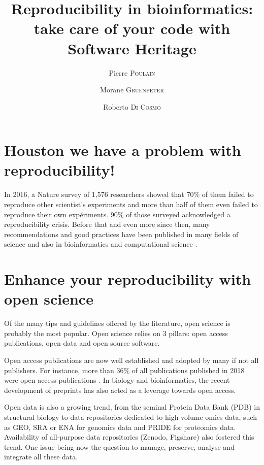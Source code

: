 \documentclass[long, final]{jobim}
\title{Reproducibility in bioinformatics: take care of your code with Software Heritage}
\author{Pierre \textsc{Poulain}\inst{1} \and Morane \textsc{Gruenpeter}\inst{2} \and Roberto \textsc{Di Cosmo}\inst{3}}
\institute{
 Université de Paris, CNRS, Institut Jacques Monod, F-75006, Paris, France
 \and
 Software Heritage, Inria, France
 \and
 Software Heritage, Inria and University of Paris, France
}
\begin{document}

   \maketitle

 \section{Houston we have a problem with reproducibility!}
 \label{sec:introduction}

In 2016, a Nature survey of 1,576 researchers \cite{baker2016b} showed that 70\% of them failed to reproduce other scientist’s experiments and more than half of them even failed to reproduce their own expériments. 90\% of those surveyed acknowledged a reproducibility crisis. Before that \cite{donoho2010,peng2011,markowetz2015} and even more since then, many recommendations and good practices have been published in many fields of science and also in bioinformatics and computational science \cite{barba2016,gruning2018,kim2018,barba2019}. 

\section{Enhance your reproducibility with open science}
\label{sec:enhance}

Of the many tips and guidelines offered by the literature, open science is probably the most popular. Open science relies on 3 pillars: open access publications, open data and open source software.

Open access publications are now well established and adopted by many if not all publishers. For instance, more than 36\% of all publications published in 2018 were open access publications \cite{trendsopenaccesspublications}. In biology and bioinformatics, the recent development of preprints has also acted as a leverage towards open access.

Open data is also a growing trend, from the seminal Protein Data Bank (PDB) in structural biology to data repositories dedicated to high volume omics data, such as GEO, SRA or ENA for genomics data and PRIDE for proteomics data. Availability of all-purpose data repositories (Zenodo, Figshare) also fostered this trend. One issue being now the question to manage, preserve, analyse and integrate all these data.
\end{document}
